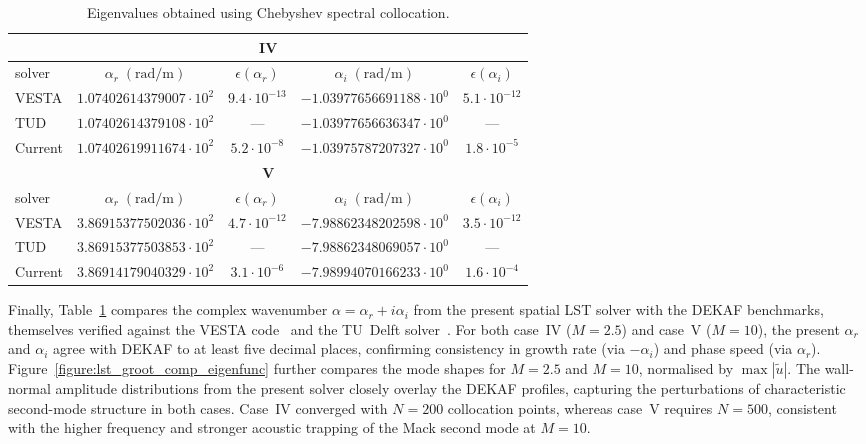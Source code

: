 \begin{table}[H]
  \centering
  \caption{Eigenvalues obtained using Chebyshev spectral collocation.}
  \label{tab:eigs_iv_v}
  \setlength{\tabcolsep}{7pt}
  \begin{tabular}{@{}lcccc@{}}
    \toprule
    \multicolumn{5}{c}{\textbf{IV}}\\
    \midrule
    solver & $\alpha_r\;(\mathrm{rad/m})$ & $\epsilon(\alpha_r)$
           & $\alpha_i\;(\mathrm{rad/m})$ & $\epsilon(\alpha_i)$ \\
    \midrule
    VESTA   & $1.07402614379007\cdot 10^{2}$ & $9.4\cdot 10^{-13}$ &
               $-1.03977656691188\cdot 10^{0}$ & $5.1\cdot 10^{-12}$ \\
    TUD     & $1.07402614379108\cdot 10^{2}$ & --- &
               $-1.03977656636347\cdot 10^{0}$ & --- \\
    Current & $1.07402619911674\cdot 10^{2}$  & $5.2\cdot 10^{-8}$ &
               $-1.03975787207327\cdot 10^{0}$ & $1.8\cdot 10^{-5}$ \\
    \midrule
    \multicolumn{5}{c}{\textbf{V}}\\
    \midrule
    solver & $\alpha_r\;(\mathrm{rad/m})$ & $\epsilon(\alpha_r)$
           & $\alpha_i\;(\mathrm{rad/m})$ & $\epsilon(\alpha_i)$ \\
    \midrule
    VESTA   & $3.86915377502036\cdot 10^{2}$ & $4.7\cdot 10^{-12}$ &
               $-7.98862348202598\cdot 10^{0}$ & $3.5\cdot 10^{-12}$ \\
    TUD     & $3.86915377503853\cdot 10^{2}$ & --- &
               $-7.98862348069057\cdot 10^{0}$ & --- \\
    Current & $3.86914179040329\cdot 10^{2}$  & $3.1\cdot 10^{-6}$ &
               $-7.98994070166233\cdot 10^{0}$ & $1.6\cdot 10^{-4}$ \\
    \bottomrule
  \end{tabular}
\end{table}

Finally, Table~\ref{tab:eigs_iv_v} compares the complex wavenumber $\alpha=\alpha_r+i\alpha_i$ from the present spatial \gls{LST} solver with the DEKAF benchmarks, themselves verified against the VESTA code~\citep{Pinna2012} and the TU~Delft solver~\citep{Groot2013}. For both case~IV ($M=2.5$) and case~V ($M=10$), the present $\alpha_r$ and $\alpha_i$ agree with DEKAF to at least five decimal places, confirming consistency in growth rate (via $-\alpha_i$) and phase speed (via $\alpha_r$). Figure~\ref{figure:lst_groot_comp_eigenfunc} further compares the mode shapes for $M=2.5$ and $M=10$, normalised by $\max|\tilde{u}|$. The wall-normal amplitude distributions from the present solver closely overlay the DEKAF profiles, capturing the perturbations of characteristic second-mode structure in both cases. Case~IV converged with $N=200$ collocation points, whereas case~V requires $N=500$, consistent with the higher frequency and stronger acoustic trapping of the Mack second mode at $M=10$.



